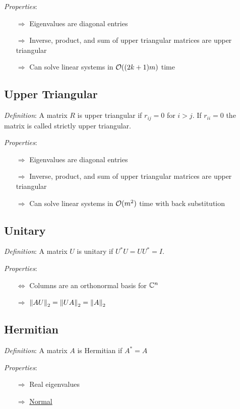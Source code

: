 \documentclass[12pt]{article}
\begin{document}
\textit{Properties}:
\begin{itemize}[nolistsep]
    \item[\(\Rightarrow\)] Eigenvalues are diagonal entries
    \item[\(\Rightarrow\)] Inverse, product, and sum of upper triangular matrices are upper triangular
    \item[\(\Rightarrow\)] Can solve linear systems in \( \mathcal{O}((2k+1)m) \) time
\end{itemize}



\subsection{Upper Triangular}
\textit{Definition}: A matrix \( R \) is upper triangular if \( r_{ij} = 0 \) for \( i>j \).
If \( r_{ii} = 0 \) the matrix is called strictly upper triangular. 

\textit{Properties}:
\begin{itemize}[nolistsep]
    \item[\(\Rightarrow\)] Eigenvalues are diagonal entries
    \item[\(\Rightarrow\)] Inverse, product, and sum of upper triangular matrices are upper triangular
    \item[\(\Rightarrow\)] Can solve linear systems in \( \mathcal{O}(m^2) \) time with back substitution
\end{itemize}


\subsection{Unitary}
\textit{Definition}: A matrix \( U \) is unitary if \( U^*U = UU^* = I  \).

\textit{Properties}:
\begin{itemize}[nolistsep]
    \item[\(\Leftrightarrow\)] Columns are an orthonormal basis for \( \mathbb{C}^n \)
    \item[\(\Rightarrow\)] \( \left\lVert AU\right\rVert_2 = \left\lVert UA\right\rVert_2 = \left\lVert A\right\rVert_2 \)
\end{itemize}


\subsection{Hermitian}
\label{sec:hermitian}
\textit{Definition}: A matrix \( A \) is Hermitian if \( A^* = A \)

\textit{Properties}:
\begin{itemize}[nolistsep]
    \item[\(\Rightarrow\)] Real eigenvalues
    \item[\(\Rightarrow\)] \hyperref[sec:normal]{Normal}
\end{itemize}
\end{document}
